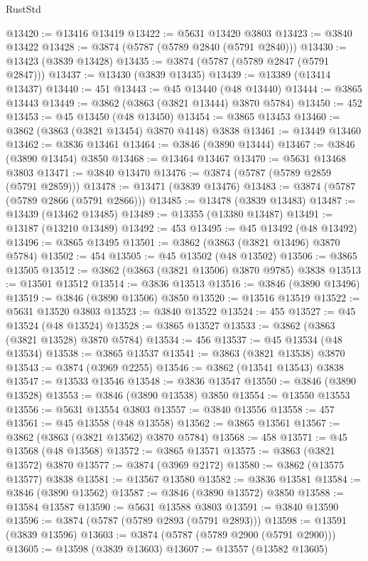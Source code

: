 \begin{lexlean}{RustStd}
\begin{coremodule}
@13420 := @13416 @13419
@13422 := @5631 @13420 @3803
@13423 := @3840 @13422
@13428 := @3874 (@5787 (@5789 @2840 (@5791 @2840)))
@13430 := @13423 (@3839 @13428)
@13435 := @3874 (@5787 (@5789 @2847 (@5791 @2847)))
@13437 := @13430 (@3839 @13435)
@13439 := @13389 (@13414 @13437)
@13440 := 451
@13443 := @45 @13440 (@48 @13440)
@13444 := @3865 @13443
@13449 := @3862 (@3863 (@3821 @13444) @3870 @5784)
@13450 := 452
@13453 := @45 @13450 (@48 @13450)
@13454 := @3865 @13453
@13460 := @3862 (@3863 (@3821 @13454) @3870 @4148) @3838
@13461 := @13449 @13460
@13462 := @3836 @13461
@13464 := @3846 (@3890 @13444)
@13467 := @3846 (@3890 @13454) @3850
@13468 := @13464 @13467
@13470 := @5631 @13468 @3803
@13471 := @3840 @13470
@13476 := @3874 (@5787 (@5789 @2859 (@5791 @2859)))
@13478 := @13471 (@3839 @13476)
@13483 := @3874 (@5787 (@5789 @2866 (@5791 @2866)))
@13485 := @13478 (@3839 @13483)
@13487 := @13439 (@13462 @13485)
@13489 := @13355 (@13380 @13487)
@13491 := @13187 (@13210 @13489)
@13492 := 453
@13495 := @45 @13492 (@48 @13492)
@13496 := @3865 @13495
@13501 := @3862 (@3863 (@3821 @13496) @3870 @5784)
@13502 := 454
@13505 := @45 @13502 (@48 @13502)
@13506 := @3865 @13505
@13512 := @3862 (@3863 (@3821 @13506) @3870 @9785) @3838
@13513 := @13501 @13512
@13514 := @3836 @13513
@13516 := @3846 (@3890 @13496)
@13519 := @3846 (@3890 @13506) @3850
@13520 := @13516 @13519
@13522 := @5631 @13520 @3803
@13523 := @3840 @13522
@13524 := 455
@13527 := @45 @13524 (@48 @13524)
@13528 := @3865 @13527
@13533 := @3862 (@3863 (@3821 @13528) @3870 @5784)
@13534 := 456
@13537 := @45 @13534 (@48 @13534)
@13538 := @3865 @13537
@13541 := @3863 (@3821 @13538) @3870
@13543 := @3874 (@3969 @2255)
@13546 := @3862 (@13541 @13543) @3838
@13547 := @13533 @13546
@13548 := @3836 @13547
@13550 := @3846 (@3890 @13528)
@13553 := @3846 (@3890 @13538) @3850
@13554 := @13550 @13553
@13556 := @5631 @13554 @3803
@13557 := @3840 @13556
@13558 := 457
@13561 := @45 @13558 (@48 @13558)
@13562 := @3865 @13561
@13567 := @3862 (@3863 (@3821 @13562) @3870 @5784)
@13568 := 458
@13571 := @45 @13568 (@48 @13568)
@13572 := @3865 @13571
@13575 := @3863 (@3821 @13572) @3870
@13577 := @3874 (@3969 @2172)
@13580 := @3862 (@13575 @13577) @3838
@13581 := @13567 @13580
@13582 := @3836 @13581
@13584 := @3846 (@3890 @13562)
@13587 := @3846 (@3890 @13572) @3850
@13588 := @13584 @13587
@13590 := @5631 @13588 @3803
@13591 := @3840 @13590
@13596 := @3874 (@5787 (@5789 @2893 (@5791 @2893)))
@13598 := @13591 (@3839 @13596)
@13603 := @3874 (@5787 (@5789 @2900 (@5791 @2900)))
@13605 := @13598 (@3839 @13603)
@13607 := @13557 (@13582 @13605)

\end{coremodule}
\end{lexlean}
